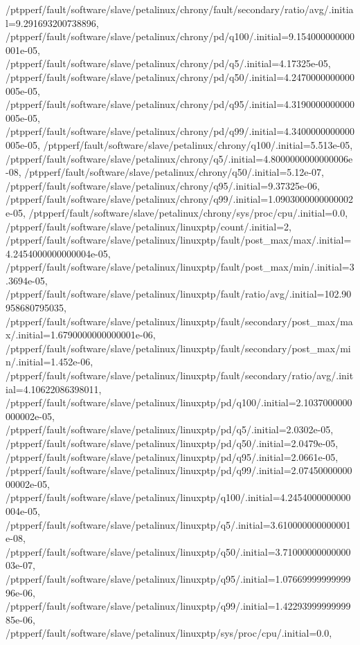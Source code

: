 {    /ptpperf/fault/software/slave/petalinux/chrony/fault/secondary/ratio/avg/.initial=9.291693200738896,
    /ptpperf/fault/software/slave/petalinux/chrony/pd/q100/.initial=9.154000000000001e-05,
    /ptpperf/fault/software/slave/petalinux/chrony/pd/q5/.initial=4.17325e-05,
    /ptpperf/fault/software/slave/petalinux/chrony/pd/q50/.initial=4.2470000000000005e-05,
    /ptpperf/fault/software/slave/petalinux/chrony/pd/q95/.initial=4.3190000000000005e-05,
    /ptpperf/fault/software/slave/petalinux/chrony/pd/q99/.initial=4.3400000000000005e-05,
    /ptpperf/fault/software/slave/petalinux/chrony/q100/.initial=5.513e-05,
    /ptpperf/fault/software/slave/petalinux/chrony/q5/.initial=4.8000000000000006e-08,
    /ptpperf/fault/software/slave/petalinux/chrony/q50/.initial=5.12e-07,
    /ptpperf/fault/software/slave/petalinux/chrony/q95/.initial=9.37325e-06,
    /ptpperf/fault/software/slave/petalinux/chrony/q99/.initial=1.0903000000000002e-05,
    /ptpperf/fault/software/slave/petalinux/chrony/sys/proc/cpu/.initial=0.0,
    /ptpperf/fault/software/slave/petalinux/linuxptp/count/.initial=2,
    /ptpperf/fault/software/slave/petalinux/linuxptp/fault/post_max/max/.initial=4.2454000000000004e-05,
    /ptpperf/fault/software/slave/petalinux/linuxptp/fault/post_max/min/.initial=3.3694e-05,
    /ptpperf/fault/software/slave/petalinux/linuxptp/fault/ratio/avg/.initial=102.90958680795035,
    /ptpperf/fault/software/slave/petalinux/linuxptp/fault/secondary/post_max/max/.initial=1.6790000000000001e-06,
    /ptpperf/fault/software/slave/petalinux/linuxptp/fault/secondary/post_max/min/.initial=1.452e-06,
    /ptpperf/fault/software/slave/petalinux/linuxptp/fault/secondary/ratio/avg/.initial=4.10622086398011,
    /ptpperf/fault/software/slave/petalinux/linuxptp/pd/q100/.initial=2.1037000000000002e-05,
    /ptpperf/fault/software/slave/petalinux/linuxptp/pd/q5/.initial=2.0302e-05,
    /ptpperf/fault/software/slave/petalinux/linuxptp/pd/q50/.initial=2.0479e-05,
    /ptpperf/fault/software/slave/petalinux/linuxptp/pd/q95/.initial=2.0661e-05,
    /ptpperf/fault/software/slave/petalinux/linuxptp/pd/q99/.initial=2.0745000000000002e-05,
    /ptpperf/fault/software/slave/petalinux/linuxptp/q100/.initial=4.2454000000000004e-05,
    /ptpperf/fault/software/slave/petalinux/linuxptp/q5/.initial=3.610000000000001e-08,
    /ptpperf/fault/software/slave/petalinux/linuxptp/q50/.initial=3.7100000000000003e-07,
    /ptpperf/fault/software/slave/petalinux/linuxptp/q95/.initial=1.0766999999999996e-06,
    /ptpperf/fault/software/slave/petalinux/linuxptp/q99/.initial=1.4229399999999985e-06,
    /ptpperf/fault/software/slave/petalinux/linuxptp/sys/proc/cpu/.initial=0.0,
}
